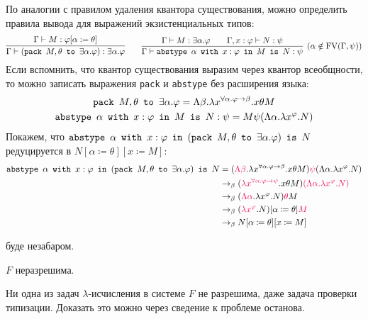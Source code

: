 По аналогии с правилом удаления квантора существования, можно определить правила вывода для выражений экзистенциальных типов:
\[
    \infer{\Gamma\vdash (\pack{M, \theta}{\exists \alpha . \varphi}) : \exists \alpha.\varphi}
        {\Gamma \vdash M : \varphi[\alpha := \theta]} \qquad
    \infer[(\alpha \notin \FV(\Gamma, \psi))]
        {\Gamma \vdash \abstype{\alpha}{x:\varphi}{M}{N:\psi}}
        {\Gamma \vdash M : \exists \alpha . \varphi && \Gamma, x : \varphi \vdash N : \psi}
\]
Если вспомнить, что квантор существования выразим через квантор всеобщности, то можно записать выражения
\texttt{pack} и \texttt{abstype} без расширения языка:
\begin{gather*}
    \mathinner{\mathtt{pack}}~M, \theta~\mathinner{\mathtt{to}}~\exists \alpha . \varphi =
        \Lambda \beta . \lambda x^{\forall \alpha . \varphi \to \beta} . x \theta M \\
    \mathinner{\mathtt{abstype}}~\alpha~\mathinner{\mathtt{with}}~x : \varphi~\mathinner{\mathtt{in}}~M~\mathinner{\mathtt{is}}~N:\psi =
        M \psi (\Lambda \alpha . \lambda x ^ \varphi . N)
\end{gather*}
Покажем, что $\mathinner{\mathtt{abstype}}~\alpha~\mathinner{\mathtt{with}}~x:\varphi~\mathinner{\mathtt{in}}~(\mathinner{\mathtt{pack}}~M,\theta~\mathinner{\mathtt{to}}~\exists\alpha .\varphi)~\mathinner{\mathtt{is}}~N$
        редуцируется в $N[\alpha\coloneqq\theta][x\coloneqq M]$:
\begin{align*}
    \abstype{\alpha}{x:\varphi}{(\pack{M,\theta}{\exists\alpha .\varphi})}{N}
    &= (\reduction{\Lambda \beta} . \lambda x^{\forall \alpha . \varphi \to \beta} . x \theta M)
        \reduction{\psi} (\Lambda \alpha . \lambda x ^ \varphi . N) \\
    &\to_\beta (\reduction{\lambda x^{\forall \alpha . \varphi \to \psi}} . x \theta M)
        \reduction{(\Lambda \alpha . \lambda x ^ \varphi . N)} \\
    &\to_\beta (\reduction{\Lambda \alpha} . \lambda x^\varphi . N) \reduction\theta M \\
    &\to_\beta (\reduction{\lambda x^\varphi} . N)[\alpha\coloneqq\theta] \reduction M \\
    &\to_\beta N[\alpha\coloneqq\theta][x\coloneqq M]
\end{align*}

\begin{example} \todo буде незабаром.
\end{example}

\begin{statement}
    $F$ неразрешима.
\end{statement}
Ни одна из задач $\lambda$-исчисления в системе $F$ не разрешима, даже задача проверки типизации.
Доказать это можно через сведение к проблеме останова.

